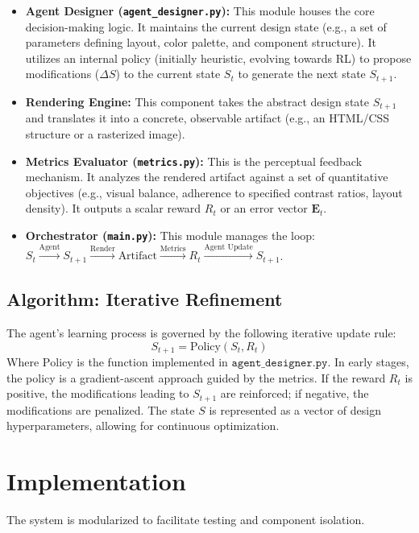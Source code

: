 \documentclass[11pt,a4paper]{article}
\begin{document}
\begin{itemize}
    \item \textbf{Agent Designer (\texttt{agent\_designer.py}):} This module houses the core decision-making logic. It maintains the current design state (e.g., a set of parameters defining layout, color palette, and component structure). It utilizes an internal policy (initially heuristic, evolving towards RL) to propose modifications ($\Delta S$) to the current state $S_t$ to generate the next state $S_{t+1}$.
    \item \textbf{Rendering Engine:} This component takes the abstract design state $S_{t+1}$ and translates it into a concrete, observable artifact (e.g., an HTML/CSS structure or a rasterized image).
    \item \textbf{Metrics Evaluator (\texttt{metrics.py}):} This is the perceptual feedback mechanism. It analyzes the rendered artifact against a set of quantitative objectives (e.g., visual balance, adherence to specified contrast ratios, layout density). It outputs a scalar reward $R_t$ or an error vector $\mathbf{E}_t$.
    \item \textbf{Orchestrator (\texttt{main.py}):} This module manages the loop: $S_t \xrightarrow{\text{Agent}} S_{t+1} \xrightarrow{\text{Render}} \text{Artifact} \xrightarrow{\text{Metrics}} R_t \xrightarrow{\text{Agent Update}} S_{t+1}$.
\end{itemize}

\subsection{Algorithm: Iterative Refinement}
The agent's learning process is governed by the following iterative update rule:
$$S_{t+1} = \text{Policy}(S_t, R_t)$$
Where $\text{Policy}$ is the function implemented in $\texttt{agent\_designer.py}$. In early stages, the policy is a gradient-ascent approach guided by the metrics. If the reward $R_t$ is positive, the modifications leading to $S_{t+1}$ are reinforced; if negative, the modifications are penalized. The state $S$ is represented as a vector of design hyperparameters, allowing for continuous optimization.

\section{Implementation}
The system is modularized to facilitate testing and component isolation.
\end{document}
